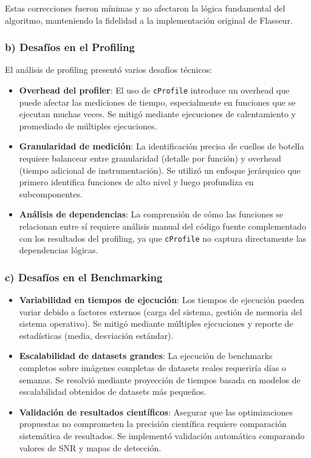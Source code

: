 Estas correcciones fueron mínimas y no afectaron la lógica fundamental del algoritmo, manteniendo la fidelidad a la implementación original de Flasseur.

\subsubsection{b) Desafíos en el Profiling}

El análisis de profiling presentó varios desafíos técnicos:

\begin{itemize}
    \item \textbf{Overhead del profiler}: El uso de \texttt{cProfile} introduce un overhead que puede afectar las mediciones de tiempo, especialmente en funciones que se ejecutan muchas veces. Se mitigó mediante ejecuciones de calentamiento y promediado de múltiples ejecuciones.
    \item \textbf{Granularidad de medición}: La identificación precisa de cuellos de botella requiere balancear entre granularidad (detalle por función) y overhead (tiempo adicional de instrumentación). Se utilizó un enfoque jerárquico que primero identifica funciones de alto nivel y luego profundiza en subcomponentes.
    \item \textbf{Análisis de dependencias}: La comprensión de cómo las funciones se relacionan entre sí requiere análisis manual del código fuente complementado con los resultados del profiling, ya que \texttt{cProfile} no captura directamente las dependencias lógicas.
\end{itemize}

\subsubsection{c) Desafíos en el Benchmarking}

\begin{itemize}
    \item \textbf{Variabilidad en tiempos de ejecución}: Los tiempos de ejecución pueden variar debido a factores externos (carga del sistema, gestión de memoria del sistema operativo). Se mitigó mediante múltiples ejecuciones y reporte de estadísticas (media, desviación estándar).
    \item \textbf{Escalabilidad de datasets grandes}: La ejecución de benchmarks completos sobre imágenes completas de datasets reales requeriría días o semanas. Se resolvió mediante proyección de tiempos basada en modelos de escalabilidad obtenidos de datasets más pequeños.
    \item \textbf{Validación de resultados científicos}: Asegurar que las optimizaciones propuestas no comprometen la precisión científica requiere comparación sistemática de resultados. Se implementó validación automática comparando valores de SNR y mapas de detección.
\end{itemize}

